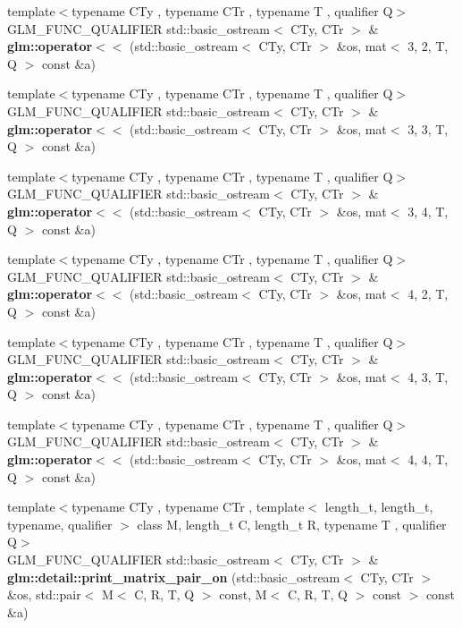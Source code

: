 \begin{DoxyCompactItemize}
\item 
{\footnotesize template$<$typename C\+Ty , typename C\+Tr , typename T , qualifier Q$>$ }\\G\+L\+M\+\_\+\+F\+U\+N\+C\+\_\+\+Q\+U\+A\+L\+I\+F\+I\+ER std\+::basic\+\_\+ostream$<$ C\+Ty, C\+Tr $>$ \& {\bfseries glm\+::operator$<$$<$} (std\+::basic\+\_\+ostream$<$ C\+Ty, C\+Tr $>$ \&os, mat$<$ 3, 2, T, Q $>$ const \&a)
\item 
{\footnotesize template$<$typename C\+Ty , typename C\+Tr , typename T , qualifier Q$>$ }\\G\+L\+M\+\_\+\+F\+U\+N\+C\+\_\+\+Q\+U\+A\+L\+I\+F\+I\+ER std\+::basic\+\_\+ostream$<$ C\+Ty, C\+Tr $>$ \& {\bfseries glm\+::operator$<$$<$} (std\+::basic\+\_\+ostream$<$ C\+Ty, C\+Tr $>$ \&os, mat$<$ 3, 3, T, Q $>$ const \&a)
\item 
{\footnotesize template$<$typename C\+Ty , typename C\+Tr , typename T , qualifier Q$>$ }\\G\+L\+M\+\_\+\+F\+U\+N\+C\+\_\+\+Q\+U\+A\+L\+I\+F\+I\+ER std\+::basic\+\_\+ostream$<$ C\+Ty, C\+Tr $>$ \& {\bfseries glm\+::operator$<$$<$} (std\+::basic\+\_\+ostream$<$ C\+Ty, C\+Tr $>$ \&os, mat$<$ 3, 4, T, Q $>$ const \&a)
\item 
{\footnotesize template$<$typename C\+Ty , typename C\+Tr , typename T , qualifier Q$>$ }\\G\+L\+M\+\_\+\+F\+U\+N\+C\+\_\+\+Q\+U\+A\+L\+I\+F\+I\+ER std\+::basic\+\_\+ostream$<$ C\+Ty, C\+Tr $>$ \& {\bfseries glm\+::operator$<$$<$} (std\+::basic\+\_\+ostream$<$ C\+Ty, C\+Tr $>$ \&os, mat$<$ 4, 2, T, Q $>$ const \&a)
\item 
{\footnotesize template$<$typename C\+Ty , typename C\+Tr , typename T , qualifier Q$>$ }\\G\+L\+M\+\_\+\+F\+U\+N\+C\+\_\+\+Q\+U\+A\+L\+I\+F\+I\+ER std\+::basic\+\_\+ostream$<$ C\+Ty, C\+Tr $>$ \& {\bfseries glm\+::operator$<$$<$} (std\+::basic\+\_\+ostream$<$ C\+Ty, C\+Tr $>$ \&os, mat$<$ 4, 3, T, Q $>$ const \&a)
\item 
{\footnotesize template$<$typename C\+Ty , typename C\+Tr , typename T , qualifier Q$>$ }\\G\+L\+M\+\_\+\+F\+U\+N\+C\+\_\+\+Q\+U\+A\+L\+I\+F\+I\+ER std\+::basic\+\_\+ostream$<$ C\+Ty, C\+Tr $>$ \& {\bfseries glm\+::operator$<$$<$} (std\+::basic\+\_\+ostream$<$ C\+Ty, C\+Tr $>$ \&os, mat$<$ 4, 4, T, Q $>$ const \&a)
\item 
\mbox{\label{io_8inl_a5b82ceb67c3495960b07267d105170c5}} 
{\footnotesize template$<$typename C\+Ty , typename C\+Tr , template$<$ length\+\_\+t, length\+\_\+t, typename, qualifier $>$ class M, length\+\_\+t C, length\+\_\+t R, typename T , qualifier Q$>$ }\\G\+L\+M\+\_\+\+F\+U\+N\+C\+\_\+\+Q\+U\+A\+L\+I\+F\+I\+ER std\+::basic\+\_\+ostream$<$ C\+Ty, C\+Tr $>$ \& {\bfseries glm\+::detail\+::print\+\_\+matrix\+\_\+pair\+\_\+on} (std\+::basic\+\_\+ostream$<$ C\+Ty, C\+Tr $>$ \&os, std\+::pair$<$ M$<$ C, R, T, Q $>$ const, M$<$ C, R, T, Q $>$ const $>$ const \&a)

\end{DoxyCompactItemize}
